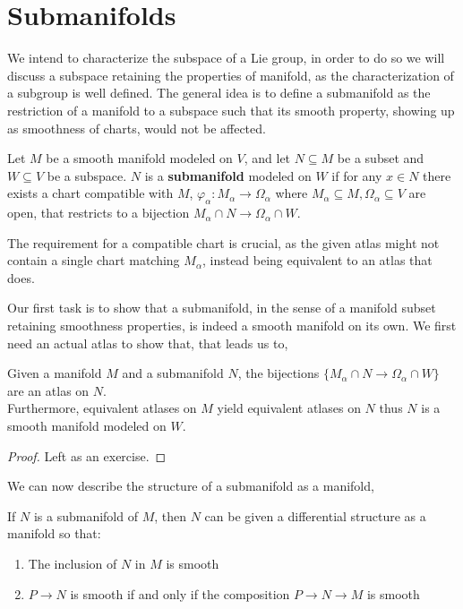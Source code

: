 \section{Submanifolds}
We intend to characterize the subspace of a Lie group, in order to do so we will discuss a subspace retaining the properties of manifold, as the characterization of a subgroup is well defined.
The general idea is to define a submanifold as the restriction of a manifold to a subspace such that its smooth property, showing up as smoothness of charts, would not be affected.
\begin{definition}[Submanifold]
	Let $M$ be a smooth manifold modeled on $V$, and let $N \subseteq M$ be a subset and $W \subseteq V$ be a subspace.
	$N$ is a \textbf{submanifold} modeled on $W$ if for any $x \in N$ there exists a chart compatible with $M$, $\varphi_{\alpha} : M_{\alpha} \to \Omega_{\alpha}$
	where $M_{\alpha} \subseteq M, \Omega_{\alpha} \subseteq V$ are open, that restricts to a bijection $M_{\alpha} \cap N \to \Omega_{\alpha} \cap W$.
\end{definition}
\begin{remark}
	The requirement for a compatible chart is crucial, as the given atlas might not contain a single chart matching $M_{\alpha}$, instead being equivalent to an atlas that does.
\end{remark}
Our first task is to show that a submanifold, in the sense of a manifold subset retaining smoothness properties, is indeed a smooth manifold on its own.
We first need an actual atlas to show that, that leads us to,
\begin{proposition}
	Given a manifold $M$ and a submanifold $N$, the bijections $\{ M_{\alpha} \cap N \to \Omega_{\alpha} \cap W \}$ are an atlas on $N$. \\
	Furthermore, equivalent atlases on $M$ yield equivalent atlases on $N$ thus $N$ is a smooth manifold modeled on $W$.
\end{proposition}
\begin{proof}
	Left as an exercise.
\end{proof}
We can now describe the structure of a submanifold as a manifold,
\begin{proposition}
	If $N$ is a submanifold of $M$, then $N$ can be given a differential structure as a manifold so that:
	\begin{enumerate}
		\item The inclusion of $N$ in $M$ is smooth
		\item $P \to N$ is smooth if and only if the composition $P \to N \to M$ is smooth
	\end{enumerate}
\end{proposition}
